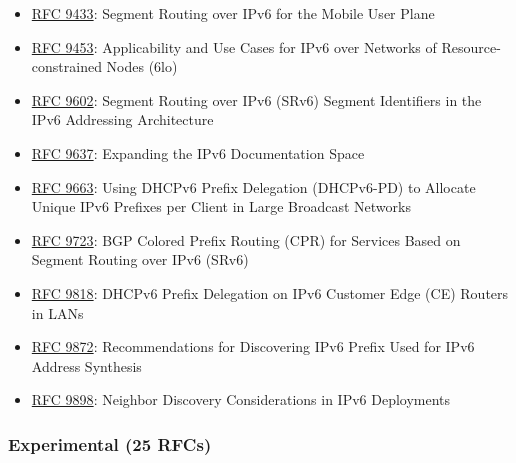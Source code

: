 \documentclass[
]{article}
\begin{document}
\begin{itemize}
\item
  \href{https://www.rfc-editor.org/info/rfc9433}{RFC 9433}: Segment
  Routing over IPv6 for the Mobile User Plane
\item
  \href{https://www.rfc-editor.org/info/rfc9453}{RFC 9453}:
  Applicability and Use Cases for IPv6 over Networks of
  Resource-constrained Nodes (6lo)
\item
  \href{https://www.rfc-editor.org/info/rfc9602}{RFC 9602}: Segment
  Routing over IPv6 (SRv6) Segment Identifiers in the IPv6 Addressing
  Architecture
\item
  \href{https://www.rfc-editor.org/info/rfc9637}{RFC 9637}: Expanding
  the IPv6 Documentation Space
\item
  \href{https://www.rfc-editor.org/info/rfc9663}{RFC 9663}: Using DHCPv6
  Prefix Delegation (DHCPv6-PD) to Allocate Unique IPv6 Prefixes per
  Client in Large Broadcast Networks
\item
  \href{https://www.rfc-editor.org/info/rfc9723}{RFC 9723}: BGP Colored
  Prefix Routing (CPR) for Services Based on Segment Routing over IPv6
  (SRv6)
\item
  \href{https://www.rfc-editor.org/info/rfc9818}{RFC 9818}: DHCPv6
  Prefix Delegation on IPv6 Customer Edge (CE) Routers in LANs
\item
  \href{https://www.rfc-editor.org/info/rfc9872}{RFC 9872}:
  Recommendations for Discovering IPv6 Prefix Used for IPv6 Address
  Synthesis
\item
  \href{https://www.rfc-editor.org/info/rfc9898}{RFC 9898}: Neighbor
  Discovery Considerations in IPv6 Deployments
\end{itemize}

\subsubsection{Experimental (25 RFCs)}\label{experimental-25-rfcs}
\end{document}
